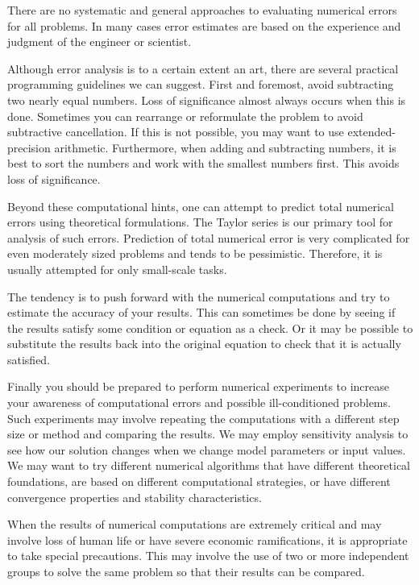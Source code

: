 \documentclass[../main.tex]{subfiles}
\begin{document}
There are no systematic and general approaches to evaluating numerical errors for all
problems. In many cases error estimates are based on the experience and judgment of the
engineer or scientist.

Although error analysis is to a certain extent an art, there are several practical programming
guidelines we can suggest. First and foremost, avoid subtracting two nearly
equal numbers. Loss of significance almost always occurs when this is done. Sometimes
you can rearrange or reformulate the problem to avoid subtractive cancellation. If this is not
possible, you may want to use extended-precision arithmetic. Furthermore, when adding
and subtracting numbers, it is best to sort the numbers and work with the smallest numbers
first. This avoids loss of significance.

Beyond these computational hints, one can attempt to predict total numerical errors
using theoretical formulations. The Taylor series is our primary tool for analysis of such
errors. Prediction of total numerical error is very complicated for even moderately sized problems
and tends to be pessimistic. Therefore, it is usually attempted for only small-scale tasks.

The tendency is to push forward with the numerical computations and try to estimate
the accuracy of your results. This can sometimes be done by seeing if the results satisfy
some condition or equation as a check. Or it may be possible to substitute the results back
into the original equation to check that it is actually satisfied.

Finally you should be prepared to perform numerical experiments to increase your
awareness of computational errors and possible ill-conditioned problems. Such experiments
may involve repeating the computations with a different step size or method and
comparing the results. We may employ sensitivity analysis to see how our solution changes
when we change model parameters or input values. We may want to try different numerical
algorithms that have different theoretical foundations, are based on different computational
strategies, or have different convergence properties and stability characteristics.

When the results of numerical computations are extremely critical and may involve
loss of human life or have severe economic ramifications, it is appropriate to take special
precautions. This may involve the use of two or more independent groups to solve the same
problem so that their results can be compared.
\end{document}
